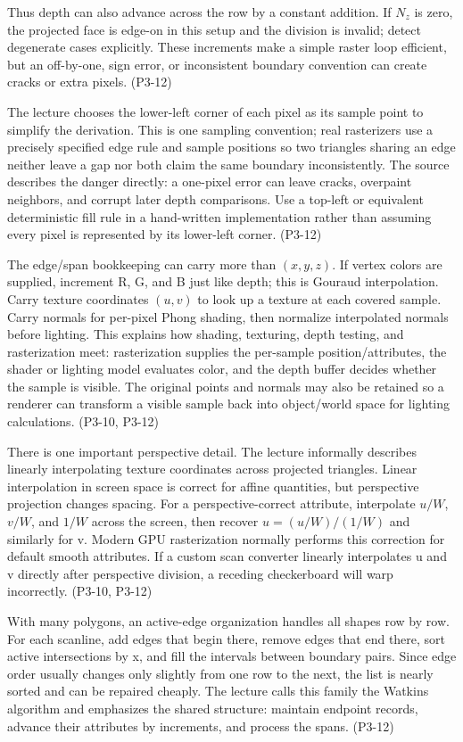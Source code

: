 Thus depth can also advance across the row by a constant addition. If \(N_z\) is zero, the projected face is edge-on in this setup and the division is invalid; detect degenerate cases explicitly. These increments make a simple raster loop efficient, but an off-by-one, sign error, or inconsistent boundary convention can create cracks or extra pixels. (P3-12)

The lecture chooses the lower-left corner of each pixel as its sample point to simplify the derivation. This is one sampling convention; real rasterizers use a precisely specified edge rule and sample positions so two triangles sharing an edge neither leave a gap nor both claim the same boundary inconsistently. The source describes the danger directly: a one-pixel error can leave cracks, overpaint neighbors, and corrupt later depth comparisons. Use a top-left or equivalent deterministic fill rule in a hand-written implementation rather than assuming every pixel is represented by its lower-left corner. (P3-12)

The edge/span bookkeeping can carry more than \((x,y,z)\). If vertex colors are supplied, increment R, G, and B just like depth; this is Gouraud interpolation. Carry texture coordinates \((u,v)\) to look up a texture at each covered sample. Carry normals for per-pixel Phong shading, then normalize interpolated normals before lighting. This explains how shading, texturing, depth testing, and rasterization meet: rasterization supplies the per-sample position/attributes, the shader or lighting model evaluates color, and the depth buffer decides whether the sample is visible. The original points and normals may also be retained so a renderer can transform a visible sample back into object/world space for lighting calculations. (P3-10, P3-12)

There is one important perspective detail. The lecture informally describes linearly interpolating texture coordinates across projected triangles. Linear interpolation in screen space is correct for affine quantities, but perspective projection changes spacing. For a perspective-correct attribute, interpolate \(u/W\), \(v/W\), and \(1/W\) across the screen, then recover \(u=(u/W)/(1/W)\) and similarly for v. Modern GPU rasterization normally performs this correction for default smooth attributes. If a custom scan converter linearly interpolates u and v directly after perspective division, a receding checkerboard will warp incorrectly. (P3-10, P3-12)

With many polygons, an active-edge organization handles all shapes row by row. For each scanline, add edges that begin there, remove edges that end there, sort active intersections by x, and fill the intervals between boundary pairs. Since edge order usually changes only slightly from one row to the next, the list is nearly sorted and can be repaired cheaply. The lecture calls this family the Watkins algorithm and emphasizes the shared structure: maintain endpoint records, advance their attributes by increments, and process the spans. (P3-12)

